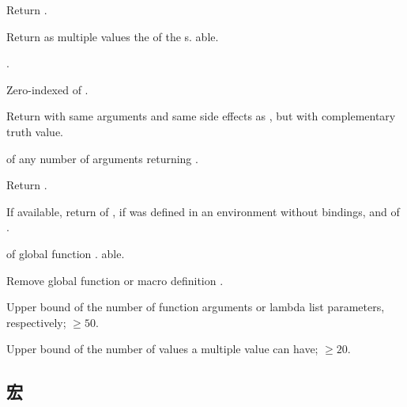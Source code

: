 \begin{LIST}{1cm}
  {
    Return .
  }

  {
  Return as multiple values the  of the
  s. able. 
  }

  {
    .
  }

  {
  Zero-indexed  of .
  }

  {
  Return  with same arguments and same side effects
  as , but with complementary truth value.
  }

  {
     of any number of arguments returning .
  }

  {
  Return .
  }

  {
  If available, return  of ,
  \retvalii{\NIL} if  was defined in an environment
  without bindings, and  of . 
  }

  {
   of global function . able.
  }

  {
  Remove global function or macro definition .
  }

  {
  Upper bound of the number of function arguments or lambda list
  parameters, respectively; $\geq50$. 
  }

  {
  Upper bound of the number of values a multiple value can have;
  $\geq20$. 
  }

\end{LIST}


\subsection{宏}
\label{section:宏}

